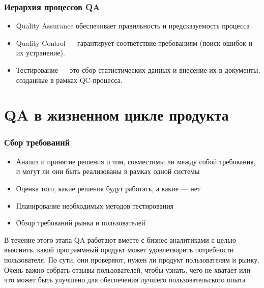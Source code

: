 \documentclass{../industrial-development}
\begin{document}
	\begin{frame} \frametitle{Иерархия процессов QA}
		\begin{itemize}
			\item Quality Assurance обеспечивает правильность и предсказуемость процесса 
			
			\item Quality Control --- гарантирует соответствие требованиям (поиск ошибок и их устранение).
			
			\item Тестирование --- это сбор статистических данных и внесение их в документы, созданные в рамках QC-процесса.
		\end{itemize}
	\end{frame}
	
		
\section{QA в жизненном цикле продукта}
	\begin{frame} \frametitle{Сбор требований}
		\begin{itemize}
			\item Анализ и принятие решения о том, совместимы ли между собой требования, и могут ли они быть реализованы в рамках одной системы
			\item Оценка того, какие решения будут работать, а какие --- нет
			\item Планирование необходимых методов тестирования
			\item Обзор требований рынка и пользователей
		\end{itemize}
	\end{frame}
\lecturenotes
В течение этого этапа QA работают вместе с бизнес-аналитиками с целью выяснить, какой программный продукт может удовлетворить потребности пользователя. По сути, они проверяют, нужен ли продукт пользователям и рынку. Очень важно собрать отзывы пользователей, чтобы узнать, чего не хватает или что может быть улучшено для обеспечения лучшего пользовательского опыта
	
\end{document}

